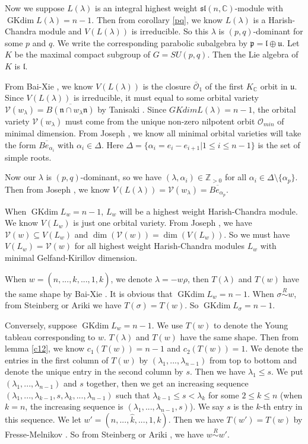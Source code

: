 \documentclass{amsart}[12pt]
\renewcommand{\subset}{\subseteq}
\newcommand{\gkd}{\operatorname{GKdim}}
\numberwithin{equation}{section}
\begin{document}
Now we suppose $L(\lambda)$ is an integral highest weight $\mathfrak{sl}(n,\mathbb{C})$-module with $\gkd L(\lambda)=n-1$. Then from corollary \ref{pq}, we know $L(\lambda)$ is a Harish-Chandra module and  $V(L(\lambda))$ is irreducible. So this $\lambda$ is $(p,q)$-dominant for some $p$ and $q$. We write the corresponding parabolic subalgebra by $\mathfrak{p}=\mathfrak{l} \oplus \mathfrak{u}$. Let $K$ be the maximal compact subgroup of $G=SU(p,q)$. Then the Lie algebra of $K$ is $\mathfrak{l}$.

From Bai-Xie \cite{BX}, we know  $V( L(\lambda))$  is the  closure $\bar{\mathcal{O}}_1$ of the first $K_{\mathbb{C}}$ orbit in $\mathfrak{u}$.
Since  $V( L(\lambda))$ is irreducible, it must equal to some orbital variety $\mathcal{V}(w_{\lambda})=\overline{B(\mathfrak{n}\cap w_{\lambda}\mathfrak{n})}$ by Tanisaki \cite{Ta}.
Since  $GKdim L(\lambda)=n-1$, the orbital variety $\mathcal{V}(w_{\lambda})$ must come from the unique non-zero nilpotent orbit $\mathcal{O}_{min}$ of minimal dimension.
From Joseph \cite{Jo98}, we know all   minimal orbital varieties will take the form $\overline{Be_{\alpha_{i}}}$ with $\alpha_i \in \Delta$. Here $\Delta=\{\alpha_i=e_i-e_{i+1}|1\leq i \leq n-1\}$ is the set of simple roots.

Now our $\lambda$ is $(p,q)$-dominant, so we have $(\lambda, \alpha_i)\in \mathbb{Z}_{>0}$ for all $\alpha_i \in \Delta \setminus \{\alpha_p\}$.
Then from Joseph \cite[Theorem 4.14]{Jo98}, we know $V( L(\lambda))=\mathcal{V}(w_{\lambda})=\overline{Be_{\alpha_{p}}}$.

When $\gkd L_w=n-1$,  $L_w$ will be a highest weight Harish-Chandra module. We know $V(L_w)$ is just one orbital variety. From Joseph \cite{Jo84}, we have $\mathcal{V}(w)\subset V(L_w)$ and  $\dim(\mathcal{V}(w))=\dim( V(L_w))$. So we must have $V(L_w)=\mathcal{V}(w)$ for all highest weight Harish-Chandra modules $L_w$ with minimal Gelfand-Kirillov dimension.

When  $w=(n,...,\hat{k},...,1,k)$, we denote $\lambda=-w\rho$, then $T(\lambda)$ and $T(w)$ have the same shape by Bai-Xie \cite{BX}. It is obvious that $\gkd L_w=n-1$. When $\sigma \stackrel{R}{\sim} w$, from Steinberg \cite{St} or Ariki \cite{Ar} we have $T(\sigma)=T(w)$. So   $\gkd L_{\sigma}=n-1$.

Conversely, suppose $\gkd L_w=n-1$. We use $T(w)$ to denote the Young tableau corresponding to $w$. $T(\lambda)$ and $T(w)$ have the same shape.  Then from lemma \ref{c12}, we know $c_1(T(w))=n-1$ and $c_2(T(w))=1$. We denote the entries in the first column of $T(w)$ by $(\lambda_1,...,\lambda_{n-1})$ from top to bottom and denote the unique entry in the second column by $s$. Then we have $\lambda_{1}\leq s$. We put $(\lambda_1,...,\lambda_{n-1})$ and $s$ together, then we get an increasing sequence $(\lambda_1,...,\lambda_{k-1},s,\lambda_{k},...,\lambda_{n-1})$ such that $ \lambda_{k-1}\leq s< \lambda_{k}$ for some $2\leq k\leq n$ (when $k=n$, the increasing sequence is $(\lambda_1,...,\lambda_{n-1},s)$). We say $s$ is the $k$-th entry in this sequence. We let $w'=(n,...,\hat{k},...,1,k)$. Then we have $T(w')=T(w)$ by Fresse-Melnikov \cite{FM}. So from Steinberg \cite{St} or Ariki \cite{Ar}, we have $w\stackrel{R}{\sim} w'$.
\end{document}
